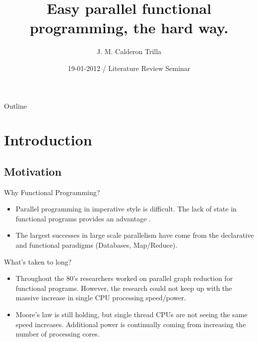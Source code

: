 \documentclass{beamer}
\title[Parallel Graph Reduction] %
{Easy parallel functional programming, the hard way.}
\subtitle
{} %
\author[] %
{J. M. Calderon Trilla}
\institute[University of York] %
{%
  Department of Computer Science\\
  PLASMA Research Group \\
  University of York
 }
\date[] %
{19-01-2012 / Literature Review Seminar}
\begin{document}
\begin{frame}
  \titlepage
\end{frame}

\begin{frame}{Outline}
  \tableofcontents
\end{frame}




\section{Introduction}

\subsection[Motivation]{Motivation}

\begin{frame}{Why Functional Programming?}
    \begin{itemize}
        \item
            Parallel programming in imperative style is difficult. The lack of state in
            functional programs provides an advantage \cite{PFPAnIntro}.
        \item
            The largest successes in large scale parallelism have come from the declarative
            and functional paradigms (Databases, Map/Reduce).
    \end{itemize}
\end{frame}

\begin{frame}{What's taken to long?}
    \begin{itemize}
        \item
            Throughout the 80's researchers worked on parallel graph reduction for functional
            programs. However, the research could not keep up with the massive increase
            in single CPU processing speed/power. 
        \item
            Moore's law is still holding, but single thread CPUs are not seeing the same speed
            increases. Additional power is continually coming from increasing the number of 
            processing cores.
             
    \end{itemize}
\end{frame}
\end{document}
